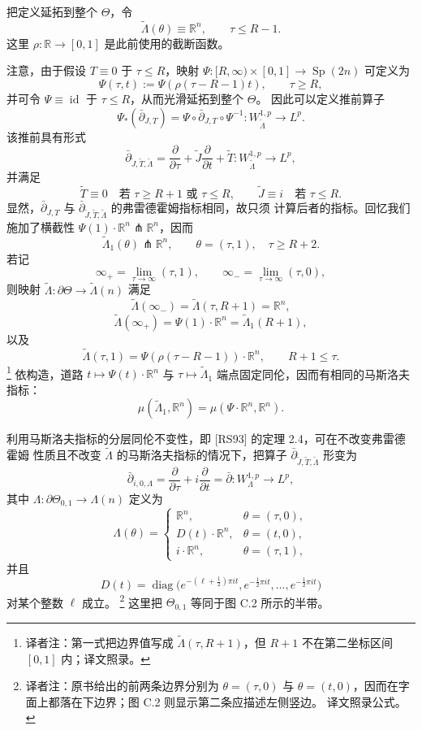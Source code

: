 把定义延拓到整个 $\Theta$，令
\[
 \widetilde\Lambda(\theta)\equiv\mathbb R^n,
 \qquad\tau\leq R-1.
\]
这里 $\rho\colon\mathbb R\to[0,1]$ 是此前使用的截断函数。

注意，由于假设 $T\equiv0$ 于 $\tau\leq R$，映射
$\Psi\colon[R,\infty)\times[0,1]\to\operatorname{Sp}(2n)$ 可定义为
\[
 \Psi(\tau,t):=\Psi(\rho(\tau-R-1)t),
 \qquad\tau\geq R,
\]
并可令 $\Psi\equiv\operatorname{id}$ 于 $\tau\leq R$，从而光滑延拓到整个 $\Theta$。
因此可以定义推前算子
\[
 \Psi_*(\bar\partial_{J,T})
 =\Psi\circ\bar\partial_{J,T}\circ\Psi^{-1}
 \colon W_{\widetilde\Lambda}^{1,p}\longrightarrow L^p.
\]
该推前具有形式
\[
 \bar\partial_{\widetilde J,\widetilde T,\widetilde\Lambda}
 =\frac\partial{\partial\tau}
 +\widetilde J\frac\partial{\partial t}+\widetilde T
 \colon W_{\widetilde\Lambda}^{1,p}\longrightarrow L^p,
\]
并满足
\[
 \widetilde T\equiv0\quad\text{若 }\tau\geq R+1\text{ 或 }\tau\leq R,
 \qquad
 \widetilde J\equiv i\quad\text{若 }\tau\leq R.
\]
显然，$\bar\partial_{J,T}$ 与
$\bar\partial_{\widetilde J,\widetilde T,\widetilde\Lambda}$ 的弗雷德霍姆指标相同，故只须
计算后者的指标。回忆我们施加了横截性
$\Psi(1)\cdot\mathbb R^n\pitchfork\mathbb R^n$，因而
\[
 \widetilde\Lambda_1(\theta)\pitchfork\mathbb R^n,
 \qquad\theta=(\tau,1),\quad\tau\geq R+2.
\]
若记
\[
 \infty_+=\lim_{\tau\to\infty}(\tau,1),
 \qquad
 \infty_-=\lim_{\tau\to\infty}(\tau,0),
\]
则映射 $\widetilde\Lambda\colon\partial\Theta\to\widetilde\Lambda(n)$ 满足
\[
 \widetilde\Lambda(\infty_-)
 =\widetilde\Lambda(\tau,R+1)=\mathbb R^n,
\]
\[
 \widetilde\Lambda(\infty_+)
 =\Psi(1)\cdot\mathbb R^n
 =\widetilde\Lambda_1(R+1),
\]
以及
\[
 \widetilde\Lambda(\tau,1)
 =\Psi(\rho(\tau-R-1))\cdot\mathbb R^n,
 \qquad R+1\leq\tau.
\]
\footnote{译者注：第一式把边界值写成
$\widetilde\Lambda(\tau,R+1)$，但 $R+1$ 不在第二坐标区间 $[0,1]$ 内；译文照录。}
依构造，道路 $t\mapsto\Psi(t)\cdot\mathbb R^n$ 与
$\tau\mapsto\widetilde\Lambda_1$ 端点固定同伦，因而有相同的马斯洛夫指标：
\begin{equation}
\label{eq:app-c-boundary-path-maslov}
 \mu(\widetilde\Lambda_1,\mathbb R^n)
 =\mu(\Psi\cdot\mathbb R^n,\mathbb R^n).
\end{equation}

利用马斯洛夫指标的分层同伦不变性，即 [RS93] 的定理 2.4，可在不改变弗雷德霍姆
性质且不改变 $\widetilde\Lambda$ 的马斯洛夫指标的情况下，把算子
$\bar\partial_{\widetilde J,\widetilde T,\widetilde\Lambda}$ 形变为
\[
 \bar\partial_{i,0,\Lambda}
 =\frac\partial{\partial\tau}+i\frac\partial{\partial t}
 =\bar\partial\colon W_\Lambda^{1,p}\longrightarrow L^p,
\]
其中 $\Lambda\colon\partial\Theta_{0,1}\to\Lambda(n)$ 定义为
\[
 \Lambda(\theta)=
 \begin{cases}
 \mathbb R^n,&\theta=(\tau,0),\\
 D(t)\cdot\mathbb R^n,&\theta=(t,0),\\
 i\cdot\mathbb R^n,&\theta=(\tau,1),
 \end{cases}
\]
并且
\[
 D(t)=\operatorname{diag}\bigl(
 e^{-(\ell+\frac12)\pi it},
 e^{-\frac12\pi it},\ldots,e^{-\frac12\pi it}\bigr)
\]
对某个整数 $\ell$ 成立。
\footnote{译者注：原书给出的前两条边界分别为 $\theta=(\tau,0)$ 与
$\theta=(t,0)$，因而在字面上都落在下边界；图 C.2 则显示第二条应描述左侧竖边。
译文照录公式。}
这里把 $\Theta_{0,1}$ 等同于图 C.2 所示的半带。
